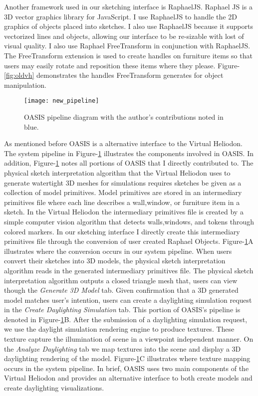		Another framework used in our sketching interface is RaphaelJS\cite{}.
		Raphael JS is a 3D vector graphics library for JavaScript. 
		I use RaphaelJS to handle the 2D graphics of objects placed into sketches. I also use RaphaelJS because it supports vectorized lines and objects, allowing our interface  to be re-sizable with lost of visual quality.
		I also use Raphael FreeTransform in conjunction with RaphaelJS\cite{}. 
		The FreeTransform extension is used to create handles on furniture items so that users may easily rotate and reposition these items where they please.
		Figure-\ref{fig:oldvh} demonstrates the handles FreeTransform generates for object manipulation.\\

		\begin{figure}[h]
		\centering
		\texttt{[image: new\_pipeline]}
		\caption{OASIS pipeline diagram with the author's contributions noted in blue.}
		\label{fig:new_pipeline}
		\end{figure}

		As mentioned before OASIS is a alternative interface to the Virtual Heliodon. 
		The system pipeline in Figure-\ref{fig:new_pipeline} illustrates the components involved in OASIS.
		In addition, Figure-\ref{fig:new_pipeline} notes all portions of OASIS that I directly contributed to.
		The physical sketch interpretation algorithm that the Virtual Heliodon uses to generate watertight 3D meshes for simulations requires sketches be given as a collection of model primitives. 
		Model primitives are stored in an intermediary primitives file where each line describes a wall,window, or furniture item in a sketch.
		In the Virtual Heliodon the intermediary primitives file is created by a simple computer vision algorithm that detects walls,windows, and tokens through colored markers.
		In our sketching interface I directly create this intermediary primitives file through the conversion of user created Raphael Objects.
		Figure-\ref{fig:new_pipeline}A illustrates where the conversion occurs in our system pipeline.
		When users convert their sketches into 3D models, the physical sketch interpretation algorithm reads in the generated intermediary primitives file.
		The physical sketch interpretation algorithm outputs a closed triangle mesh that, users can view though the \textit{Generate 3D Model} tab.
		Given confirmation that a 3D generated model matches user's intention, users can create a daylighting simulation request in the \textit{Create Daylighting Simulation} tab.
		This portion of OASIS's pipeline is denoted in Figure-\ref{fig:new_pipeline}B.
		After the submission of a daylighting simulation request, we use the daylight simulation rendering engine to produce textures.
		These texture capture the illumination of scene in a viewpoint independent manner.
		On the \textit{Analyze Daylighting} tab we map textures into the scene and display a 3D daylighting rendering of the model.
		Figure-\ref{fig:new_pipeline}C illustrates where texture mapping occurs in the system pipeline.
		In brief, OASIS uses two main components of the Virtual Heliodon and provides an alternative interface to both create models and create daylighting visualizations.

